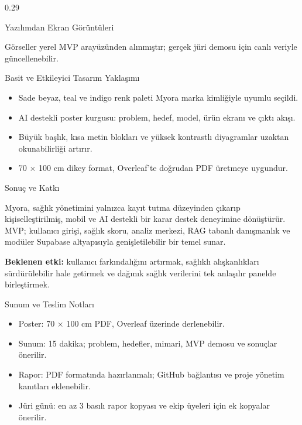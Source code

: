 \documentclass[final]{beamer}
\newenvironment{posterblock}[1]{%
  \begin{block}{#1}\justifying\small
}{%
  \end{block}
}
\begin{document}
\begin{frame}[t]
\begin{columns}[t,totalwidth=\textwidth]
\begin{column}{0.29\textwidth}
\begin{posterblock}{Yazılımdan Ekran Görüntüleri}
{\scriptsize\textcolor{myoraMuted}{Görseller yerel MVP arayüzünden alınmıştır; gerçek jüri demosu için canlı veriyle güncellenebilir.}}
\end{posterblock}

\begin{posterblock}{Basit ve Etkileyici Tasarım Yaklaşımı}
\begin{itemize}\setlength\itemsep{0.20em}
  \item Sade beyaz, teal ve indigo renk paleti Myora marka kimliğiyle uyumlu seçildi.
  \item AI destekli poster kurgusu: problem, hedef, model, ürün ekranı ve çıktı akışı.
  \item Büyük başlık, kısa metin blokları ve yüksek kontrastlı diyagramlar uzaktan okunabilirliği artırır.
  \item 70 $\times$ 100 cm dikey format, Overleaf'te doğrudan PDF üretmeye uygundur.
\end{itemize}
\end{posterblock}

\begin{posterblock}{Sonuç ve Katkı}
Myora, sağlık yönetimini yalnızca kayıt tutma düzeyinden çıkarıp kişiselleştirilmiş, mobil ve AI destekli bir karar destek deneyimine dönüştürür. MVP; kullanıcı girişi, sağlık skoru, analiz merkezi, RAG tabanlı danışmanlık ve modüler Supabase altyapısıyla genişletilebilir bir temel sunar.

\vspace{0.15cm}
\textbf{Beklenen etki:} kullanıcı farkındalığını artırmak, sağlıklı alışkanlıkları sürdürülebilir hale getirmek ve dağınık sağlık verilerini tek anlaşılır panelde birleştirmek.
\end{posterblock}

\begin{posterblock}{Sunum ve Teslim Notları}
\begin{itemize}\setlength\itemsep{0.18em}
  \item Poster: 70 $\times$ 100 cm PDF, Overleaf üzerinde derlenebilir.
  \item Sunum: 15 dakika; problem, hedefler, mimari, MVP demosu ve sonuçlar önerilir.
  \item Rapor: PDF formatında hazırlanmalı; GitHub bağlantısı ve proje yönetim kanıtları eklenebilir.
  \item Jüri günü: en az 3 basılı rapor kopyası ve ekip üyeleri için ek kopyalar önerilir.
\end{itemize}
\end{posterblock}


\end{column}
\end{columns}
\end{frame}
\end{document}
